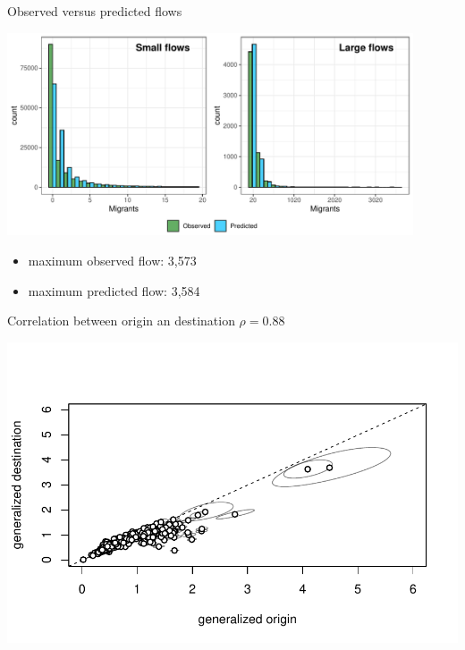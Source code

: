 \documentclass{beamer}
\begin{document}
\begin{frame}{Observed versus predicted flows}
\begin{center}
	\includegraphics[width=0.9\textwidth]{../../fig/hist_fit}      
\end{center}
\begin{itemize}
	\item \alert{maximum} observed flow: 3,573
	\item \alert{maximum} predicted flow: 3,584
\end{itemize}
\end{frame}

\begin{frame}{Correlation between origin an destination $\rho = 0.88$}
				\begin{center}
		\includegraphics[width=\textwidth]{../../fig/correlation}      
	\end{center}
\end{frame}
\end{document}
